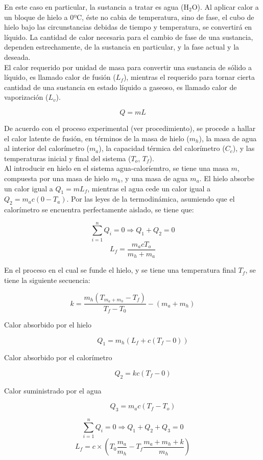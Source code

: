 \documentclass[DIV=calc, paper=a4, fontsize=11pt, twocolumn, spanish]{scrartcl}	 %
\begin{document}
En este caso en particular, la sustancia a tratar es agua (H$_2$O). Al aplicar calor a un bloque de hielo a $0º$C, éste no cabia de temperatura, sino de fase, el cubo de hielo bajo las circunstancias debidas de tiempo y temperatura, se convertirá en líquido. La cantidad de calor necesaria para el cambio de fase de una sustancia, dependen estrechamente, de la sustancia en particular, y la fase actual y la deseada.\\

El calor requerido por unidad de masa para convertir una sustancia de sólido a líquido, es llamado calor de fusión ($L_f$), mientras el requerido para tornar cierta cantidad de una sustancia en estado líquido a gaseoso, es llamado calor de vaporización ($L_v$).

$$Q = mL$$

De acuerdo con el proceso experimental (ver procedimiento), se procede a hallar el calor latente de fusión, en términos de la masa de hielo ($m_h$), la masa de agua al interior del calorímetro ($m_a$), la capacidad térmica del calorímetro ($C_c$), y las temperaturas inicial y final del sistema ($T_o$, $T_f$).\\

Al introducir en hielo en el sistema agua-caloríemtro, se tiene una masa $m$, compuesta por una masa de hielo $m_h$, y una masa de agua $m_a$. El hielo absorbe un calor igual a $Q_1 = mL_f$, mientras el agua cede un calor igual a $Q_2 = m_ac(0 - T_a)$. Por las leyes de la termodinámica, asumiendo que el calorímetro se encuentra perfectamente aislado, se tiene que:

$$\sum_{i = 1}^{n} Q_i = 0 \Rightarrow Q_1 + Q_2 = 0$$
$$L_f = \frac{m_acT_o}{m_h + m_a}$$

En el proceso en el cual se funde el hielo, y se tiene una temperatura final $T_f$, se tiene la siguiente secuencia:

$$k = \frac{m_h(T_{m_a + m_h} - T_f)}{T_f - T_0} - (m_a + m_h)$$

\begin{description}
\item[Calor absorbido por el hielo] $$Q_1 = m_h(L_f + c(T_f - 0))$$
\item[Calor absorbido por el calorímetro] $$Q_2 = kc(T_f - 0)$$
\item[Calor suministrado por el agua] $$Q_3 = m_ac(T_f - T_o)$$
\end{description}

$$\sum_{i = 1}^{n} Q_i = 0 \Rightarrow Q_1 + Q_2 + Q_3 = 0$$
$$L_f = c \times \left( T_0 \frac{m_a}{m_h} - T_f \frac{m_a + m_h + k}{m_h}\right)$$
\end{document}
